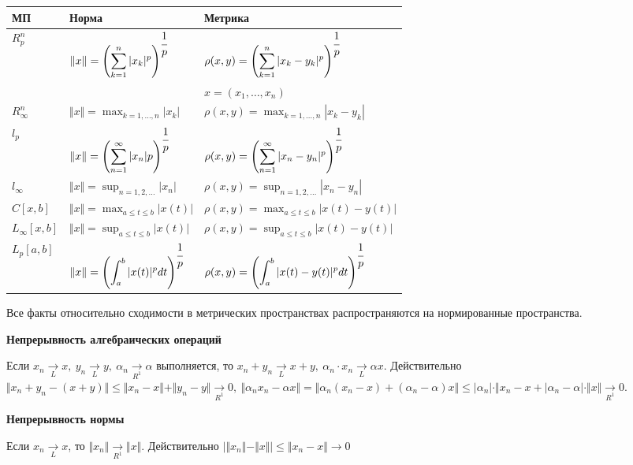 \documentclass[12pt]{report}
\renewcommand{\[}{$\\\displaystyle}
\renewcommand{\]}{\\$}
\renewcommand{\[}{$\\\displaystyle}
\newcommand{\ds}{\displaystyle}
\newcommand{\sep}{,\ }
\begin{document}
\begin{tabularx}{\textwidth}{| l | X | X |}\hline
  МП & Норма & Метрика \\\hline
  $R_p^n$
    & $ \ds \Vert x \Vert =\left(\sum_{k=1}^n |x_k|^p\right)^{\cfrac{1}{p}} $
    & $ \ds \rho(x,y)=\left(\sum_{k=1}^n|x_k-y_k|^p\right)^{\cfrac{1}{p}} $ \\
  & & $ \ds x=(x_1,\dots,x_n) $ \\
  $R_\infty^n$
    & $ \ds \Vert x \Vert =\max_{k=1,\dots,n}|x_k|$
    & $ \ds \rho(x,y)=\max_{k=1,\dots,n}|x_k-y_k|$ \\
  $l_p$
    & $ \ds \Vert x \Vert =\left(\sum_{n=1}^\infty |x_n|p\right)^{\cfrac{1}{p}}$
    & $ \ds \rho(x,y)=\left(\sum_{n=1}^\infty|x_n-y_n|^p\right)^{\cfrac{1}{p}}$ \\
  $l_\infty$
    & $ \ds \Vert x \Vert =\sup_{n=1,2,\dots} |x_n| $
    & $ \ds \rho(x,y)=\sup_{n=1,2,\dots} |x_n-y_n|$ \\
  $C[x,b]$
    & $ \ds \Vert x \Vert =\max_{a \leq t \leq b}|x(t)|$
    & $ \ds \rho(x,y)=\max_{a \leq t \leq b}|x(t)-y(t)|$ \\
  $L_\infty[x,b]$
    & $ \ds \Vert x \Vert =\sup_{a \leq t \leq b}|x(t)|$
    & $ \ds \rho(x,y)=\sup_{a \leq t \leq b}|x(t)-y(t)|$ \\
  $L_p[a,b]$
    & $ \ds \Vert x \Vert =\left(\int_a^b |x(t)|^p dt\right)^{\cfrac{1}{p}}$
    & $ \ds \rho(x,y)=\left(\int_a^b |x(t)-y(t)|^p dt\right)^{\cfrac{1}{p}}$ \\\hline
\end{tabularx}

Все факты относительно сходимости в метрических пространствах распространяются на нормированные пространства.

\textbf{Непрерывность алгебраических операций}

Если
$ \ds x_n \xrightarrow[L]{} x \sep y_n \xrightarrow[L]{} y \sep \alpha_n \xrightarrow[R^1]{} \alpha $
выполняется, то
$ \ds x_n+y_n \xrightarrow[L]{} x+y \sep \alpha_n \cdot x_n \xrightarrow[L]{} \alpha x $.
Действительно
$ \ds \Vert x_n+y_n-(x+y) \Vert  \leq  \Vert x_n-x \Vert  +  \Vert y_n-y \Vert  \xrightarrow[R^1]{} 0 \sep \Vert \alpha_n x_n - \alpha x \Vert  =  \Vert \alpha_n (x_n - x)+ (\alpha_n - \alpha) x \Vert  \leq |\alpha_n| \cdot  \Vert x_n-x+|\alpha_n-\alpha| \cdot  \Vert x \Vert  \xrightarrow[R^1]{} 0 $.

\textbf{Непрерывность нормы}

Если $x_n \xrightarrow[L]{} x$, то $ \Vert x_n \Vert  \xrightarrow[R^1]{}  \Vert x \Vert $. Действительно $|  \Vert x_n \Vert - \Vert x \Vert  | \leq  \Vert x_n - x \Vert  \rightarrow 0$
\end{document}
